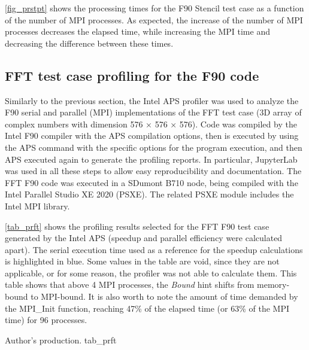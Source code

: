 \autoref {fig_prstpt} shows the processing times for the F90 Stencil test case as a function of the number of MPI processes. As expected, the increase of the number of MPI processes decreases the elapsed time, while increasing the MPI time and decreasing the difference between these times.

%
%
%
\subsection{FFT test case profiling for the F90 code}

Similarly to the previous section, the Intel APS profiler was used to analyze the F90 serial and parallel (MPI) implementations of the FFT test case (3D array of complex numbers with dimension 576 × 576 × 576). Code was compiled by the Intel F90 compiler with the APS compilation options, then is executed by using the APS command with the specific options for the program execution, and then APS executed again to generate the profiling reports. In particular, JupyterLab was used in all these steps to allow easy reproducibility and documentation. The FFT F90 code was executed in a SDumont B710 node, being compiled with the Intel Parallel Studio XE 2020 (PSXE). The related PSXE module includes the Intel MPI library.

\autoref {tab_prft} shows the profiling results selected for the FFT F90 test case generated  by the Intel APS (speedup and parallel efficiency were calculated apart). The serial execution time used as a reference for the speedup calculations is highlighted in blue. Some values in the table are void, since they are not applicable, or for some reason, the profiler was not able to calculate them.  This table shows that above 4 MPI processes, the \textit {Bound} hint shifts from memory-bound to MPI-bound. It is also worth to note the amount of time demanded by the MPI\_Init function, reaching 47\% of the elapsed time (or 63\% of the MPI time) for 96 processes. 

     {Author's production.} {tab_prft}

